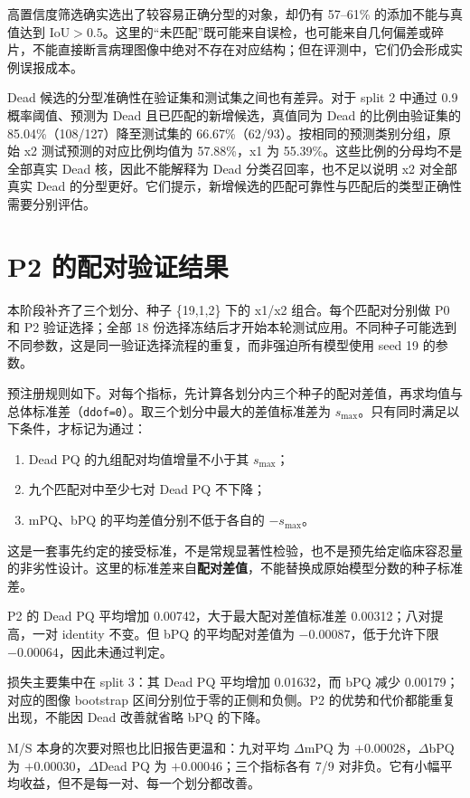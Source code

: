 \documentclass[11pt,a4paper,UTF8,fontset=fandol]{ctexart}
\newcommand{\code}[1]{\nolinkurl{#1}}
\begin{document}
高置信度筛选确实选出了较容易正确分型的对象，却仍有 57--61\% 的添加不能与真值达到 IoU$>0.5$。这里的“未匹配”既可能来自误检，也可能来自几何偏差或碎片，不能直接断言病理图像中绝对不存在对应结构；但在评测中，它们仍会形成实例误报成本。

Dead 候选的分型准确性在验证集和测试集之间也有差异。对于 split 2 中通过 0.9 概率阈值、预测为 Dead 且已匹配的新增候选，真值同为 Dead 的比例由验证集的 85.04\%（108/127）降至测试集的 66.67\%（62/93）。按相同的预测类别分组，原始 x2 测试预测的对应比例均值为 57.88\%，x1 为 55.39\%。这些比例的分母均不是全部真实 Dead 核，因此不能解释为 Dead 分类召回率，也不足以说明 x2 对全部真实 Dead 的分型更好。它们提示，新增候选的匹配可靠性与匹配后的类型正确性需要分别评估。

\section{P2 的配对验证结果}

本阶段补齐了三个划分、种子 \{19,1,2\} 下的 x1/x2 组合。每个匹配对分别做 P0 和 P2 验证选择；全部 18 份选择冻结后才开始本轮测试应用。不同种子可能选到不同参数，这是同一验证选择流程的重复，而非强迫所有模型使用 seed 19 的参数\cite{matchedplan}。

预注册规则如下。对每个指标，先计算各划分内三个种子的配对差值，再求均值与总体标准差（\code{ddof=0}）。取三个划分中最大的差值标准差为 $s_{\max}$。只有同时满足以下条件，才标记为通过：
\begin{enumerate}
\item Dead PQ 的九组配对均值增量不小于其 $s_{\max}$；
\item 九个匹配对中至少七对 Dead PQ 不下降；
\item mPQ、bPQ 的平均差值分别不低于各自的 $-s_{\max}$。
\end{enumerate}

这是一套事先约定的接受标准，不是常规显著性检验，也不是预先给定临床容忍量的非劣性设计。这里的标准差来自\textbf{配对差值}，不能替换成原始模型分数的种子标准差。

P2 的 Dead PQ 平均增加 0.00742，大于最大配对差值标准差 0.00312；八对提高，一对 identity 不变。但 bPQ 的平均配对差值为 $-0.00087$，低于允许下限 $-0.00064$，因此未通过判定。

损失主要集中在 split 3：其 Dead PQ 平均增加 0.01632，而 bPQ 减少 0.00179；对应的图像 bootstrap 区间分别位于零的正侧和负侧。P2 的优势和代价都能重复出现，不能因 Dead 改善就省略 bPQ 的下降。

M/S 本身的次要对照也比旧报告更温和：九对平均 $\Delta$mPQ 为 $+0.00028$，$\Delta$bPQ 为 $+0.00030$，$\Delta$Dead PQ 为 $+0.00046$；三个指标各有 7/9 对非负。它有小幅平均收益，但不是每一对、每一个划分都改善。
\end{document}
